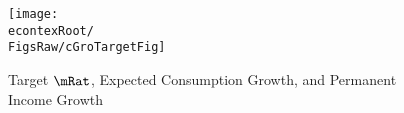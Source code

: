 \begin{figure}[tbp]
\centerline{\texttt{[image: \\econtexRoot/\\FigsRaw/cGroTargetFig]}}
\caption{Target $\mRat$, Expected Consumption Growth, and Permanent Income Growth}
\label{fig:cGroTargetFig}
\end{figure}
